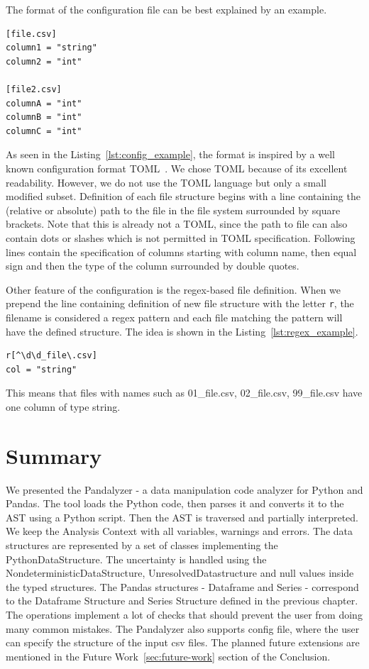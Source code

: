 The format of the configuration file can be best explained by an example.

\begin{lstlisting}[caption=An example configuration file, label={lst:config_example}, captionpos=b]
[file.csv]
column1 = "string"
column2 = "int"

[file2.csv]
columnA = "int"
columnB = "int"
columnC = "int"
\end{lstlisting}

As seen in the Listing~\ref{lst:config_example}, the format is inspired by a well known configuration format
TOML~\cite{toml_spec}.
We chose TOML because of its excellent readability.
However, we do not use the TOML language but only a small modified subset.
Definition of each file structure begins with a line containing the (relative or absolute) path to the file in the file
system surrounded by square brackets.
Note that this is already not a TOML, since the path to file can also contain dots or slashes which is not permitted in
TOML specification.
Following lines contain the specification of columns starting with column name, then equal sign and then the type of the
column surrounded by double quotes.

Other feature of the configuration is the regex-based file definition.
When we prepend the line containing definition of new file structure with the letter \verb|r|, the filename is
considered a regex pattern and each file matching the pattern will have the defined structure.
The idea is shown in the Listing~\ref{lst:regex_example}.

\begin{lstlisting}[caption=An example regex-based file definition, label={lst:regex_example}, captionpos=b]
r[^\d\d_file\.csv]
col = "string"
\end{lstlisting}

This means that files with names such as 01\_file.csv, 02\_file.csv, 99\_file.csv have one column of type string.

\section*{Summary}

We presented the Pandalyzer - a data manipulation code analyzer for Python and Pandas.
The tool loads the Python code, then parses it and converts it to the AST using a Python script.
Then the AST is traversed and partially interpreted.
We keep the Analysis Context with all variables, warnings and errors.
The data structures are represented by a set of classes implementing the PythonDataStructure.
The uncertainty is handled using the NondeterministicDataStructure, UnresolvedDatastructure and null values inside the
typed structures.
The Pandas structures - Dataframe and Series - correspond to the Dataframe Structure and Series Structure defined
in the previous chapter.
The operations implement a lot of checks that should prevent the user from doing many common mistakes.
The Pandalyzer also supports config file, where the user can specify the structure of the input csv files.
The planned future extensions are mentioned in the Future Work~\ref{sec:future-work} section of the Conclusion.